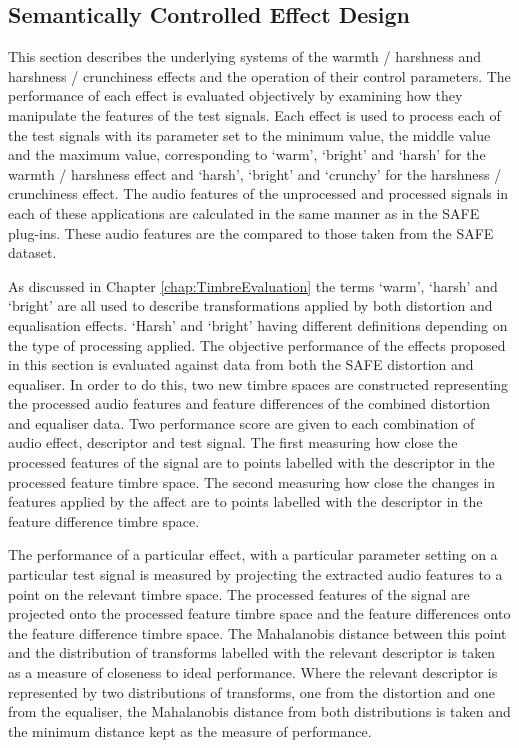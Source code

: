 	\subsection{Semantically Controlled Effect Design}
	\label{sec:PerceptualExperiments-SemanticControl-EffectDesign}
		This section describes the underlying systems of the warmth / harshness and harshness / crunchiness effects
		and the operation of their control parameters. The performance of each effect is evaluated objectively by
		examining how they manipulate the features of the test signals. Each effect is used to process each of the
		test signals with its parameter set to the minimum value, the middle value and the maximum value,
		corresponding to `warm', `bright' and `harsh' for the warmth / harshness effect and `harsh', `bright' and
		`crunchy' for the harshness / crunchiness effect. The audio features of the unprocessed and processed
		signals in each of these applications are calculated in the same manner as in the SAFE plug-ins. These audio
		features are the compared to those taken from the SAFE dataset.

		As discussed in Chapter \ref{chap:TimbreEvaluation} the terms `warm', `harsh' and `bright' are all used to
		describe transformations applied by both distortion and equalisation effects. `Harsh' and `bright' having
		different definitions depending on the type of processing applied. The objective performance of the effects
		proposed in this section is evaluated against data from both the SAFE distortion and equaliser. In order to
		do this, two new timbre spaces are constructed representing the processed audio features and feature
		differences of the combined distortion and equaliser data. Two performance score are given to each
		combination of audio effect, descriptor and test signal. The first measuring how close the processed
		features of the signal are to points labelled with the descriptor in the processed feature timbre space.
		The second measuring how close the changes in features applied by the affect are to points labelled with the
		descriptor in the feature difference timbre space.

		The performance of a particular effect, with a particular parameter setting on a particular test signal is
		measured by projecting the extracted audio features to a point on the relevant timbre space. The processed
		features of the signal are projected onto the processed feature timbre space and the feature differences
		onto the feature difference timbre space. The Mahalanobis distance between this point and the distribution
		of transforms labelled with the relevant descriptor is taken as a measure of closeness to ideal performance.
		Where the relevant descriptor is represented by two distributions of transforms, one from the distortion and
		one from the equaliser, the Mahalanobis distance from both distributions is taken and the minimum distance
		kept as the measure of performance.

